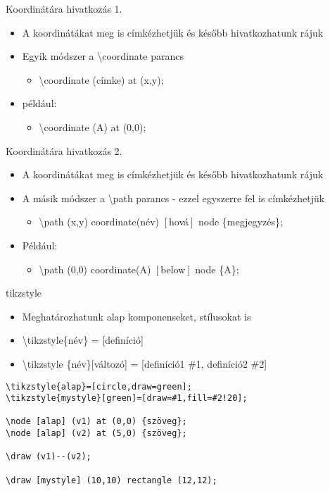 \documentclass[11pt]{beamer}
\newcommand{\tbs}{\textbackslash}
\begin{document}
\begin{frame}{Koordinátára hivatkozás 1.}
\begin{itemize}
\item A koordinátákat meg is címkézhetjük és később hivatkozhatunk rájuk
\item Egyik módszer a \tbs coordinate parancs
	\begin{itemize}
	\item \tbs coordinate (címke) at (x,y);
	\end{itemize}
\item például:
	\begin{itemize}
	\item \tbs coordinate (A) at (0,0);
	\end{itemize}
\end{itemize}
\end{frame}

\begin{frame}{Koordinátára hivatkozás 2.}
\begin{itemize}
\item A koordinátákat meg is címkézhetjük és később hivatkozhatunk rájuk
\item A másik módszer a \tbs path parancs - ezzel egyszerre fel is címkézhetjük
	\begin{itemize}
	\item \tbs path (x,y) coordinate(név) $\left[\right.$hová$\left.\right]$ node \{megjegyzés\};
	\end{itemize}
\item Például:
	\begin{itemize}
	\item \tbs path (0,0) coordinate(A) $\left[\right.$below$\left.\right]$ node \{A\};
	\end{itemize}
\end{itemize}
\end{frame}

\begin{frame}[fragile]{tikzstyle}
\begin{itemize}
\item Meghatározhatunk alap komponenseket, stílusokat is
\item \tbs tikzstyle\{név\} = [definíció]
\item \tbs tikzstyle \{név\}[változó] = [definíció1 \#1, definíció2 \#2]
\end{itemize}

\begin{verbatim}
\tikzstyle{alap}=[circle,draw=green];
\tikzstyle{mystyle}[green]=[draw=#1,fill=#2!20];
 
\node [alap] (v1) at (0,0) {szöveg};
\node [alap] (v2) at (5,0) {szöveg};

\draw (v1)--(v2);

\draw [mystyle] (10,10) rectangle (12,12);
\end{verbatim}
\end{frame}
\end{document}
